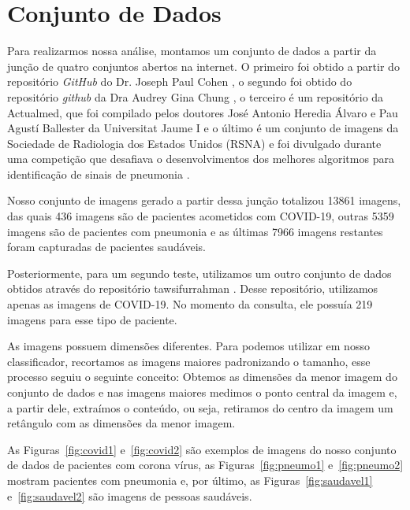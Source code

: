 \documentclass[
12pt,        %
oneside,     %
a4paper,     %
english,       %
brazil        %
%
%
]{ppgca}
\begin{document}
\section{Conjunto de Dados}
Para realizarmos nossa análise, montamos um conjunto de dados a partir da junção de quatro conjuntos abertos na internet. O primeiro foi obtido a partir do repositório \textit{GitHub} do Dr. Joseph Paul Cohen \cite{repo1}, o segundo foi obtido do repositório \textit{github} da Dra Audrey Gina Chung \cite{repo2}, o terceiro é um repositório da Actualmed, que foi compilado pelos doutores José Antonio Heredia Álvaro e Pau Agustí Ballester da Universitat Jaume I \cite{repo3} e o último é um conjunto de imagens da Sociedade de Radiologia dos Estados Unidos (RSNA) e foi divulgado durante uma competição que desafiava o desenvolvimentos dos melhores algoritmos para identificação de sinais de pneumonia \cite{repo4}.

Nosso conjunto de imagens gerado a partir dessa junção totalizou 13861 imagens, das quais 436 imagens são de pacientes acometidos com COVID-19, outras 5359 imagens são de pacientes com pneumonia e as últimas 7966 imagens restantes foram capturadas de pacientes saudáveis.

Posteriormente, para um segundo teste, utilizamos um outro conjunto de dados obtidos através do repositório tawsifurrahman \cite{repo5}. Desse repositório, utilizamos apenas as imagens de COVID-19. No momento da consulta, ele possuía 219 imagens para esse tipo de paciente.

As imagens possuem dimensões diferentes. Para podemos utilizar em nosso classificador, recortamos as imagens maiores padronizando o tamanho, esse processo seguiu o seguinte conceito: Obtemos as dimensões da menor imagem do conjunto de dados e nas imagens maiores medimos o ponto central da imagem e, a partir dele, extraímos o conteúdo, ou seja, retiramos do centro da imagem um retângulo com as dimensões da menor imagem.

As Figuras~\ref{fig:covid1} e~\ref{fig:covid2} são exemplos de imagens do nosso conjunto de dados de pacientes com corona vírus, as Figuras~\ref{fig:pneumo1} e~\ref{fig:pneumo2} mostram pacientes com pneumonia e, por último, as Figuras~\ref{fig:saudavel1} e~\ref{fig:saudavel2} são imagens de pessoas saudáveis.
\end{document}
